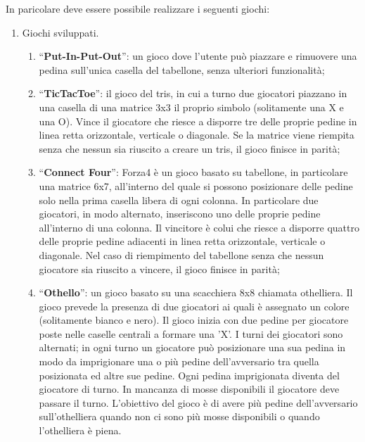 In paricolare deve essere possibile realizzare i seguenti giochi:
%
\begin{enumerate}[resume]
    \item Giochi sviluppati.
    \begin{enumerate}[label*=\arabic*.]
        \item ``\textbf{Put-In-Put-Out}'': un gioco dove l'utente può piazzare e rimuovere una pedina sull'unica casella del tabellone, senza ulteriori funzionalità;
        \item ``\textbf{TicTacToe}'': il gioco del tris, in cui a turno due giocatori piazzano in una casella di una matrice 3x3 il proprio simbolo (solitamente una X e una O).
        Vince il giocatore che riesce a disporre tre delle proprie pedine in linea retta orizzontale, verticale o diagonale.
        Se la matrice viene riempita senza che nessun sia riuscito a creare un tris, il gioco finisce in parità;
        \item ``\textbf{Connect Four}'': Forza4 è un gioco basato su tabellone, in particolare una matrice 6x7, all'interno del quale si possono posizionare delle pedine solo nella prima casella libera di ogni colonna.
        In particolare due giocatori, in modo alternato, inseriscono uno delle proprie pedine all'interno di una colonna.
        Il vincitore è colui che riesce a disporre quattro delle proprie pedine adiacenti in linea retta orizzontale, verticale o diagonale.
        Nel caso di riempimento del tabellone senza che nessun giocatore sia riuscito a vincere, il gioco finisce in parità;
        \item ``\textbf{Othello}'': un gioco basato su una scacchiera 8x8 chiamata othelliera.
        Il gioco prevede la presenza di due giocatori ai quali è assegnato un colore (solitamente bianco e nero). 
        Il gioco inizia con due pedine per giocatore poste nelle caselle centrali a formare una 'X'.
        I turni dei giocatori sono alternati; in ogni turno un giocatore può posizionare una sua pedina in modo da imprigionare una o più pedine dell'avversario tra quella posizionata ed altre sue pedine.
        Ogni pedina imprigionata diventa del giocatore di turno. 
        In mancanza di mosse disponibili il giocatore deve passare il turno.
        L'obiettivo del gioco è di avere più pedine dell'avversario sull'othelliera quando non ci sono più mosse disponibili o quando l'othelliera è piena.
    \end{enumerate}
\end{enumerate}

